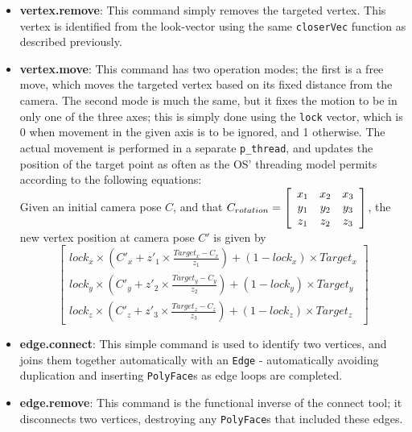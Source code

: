 \documentclass[a4paper,10pt]{article}
\begin{document}
\begin{itemize}
{Therefore, with arbitrary vectors $A$ and $B$, $A ~<~ B~$ iff \\$~(A - O ~\times~ A - V) ~~<~~ (B - O ~\times~ B - V)$. \\
}
\item{\textbf{vertex.remove}: This command simply removes the targeted vertex. This vertex is identified from the look-vector using the same \texttt{closerVec} function as described previously.}
\item{\textbf{vertex.move}: This command has two operation modes; the first is a free move, which moves the targeted vertex based on its fixed distance from the camera. The second mode is much the same, but it fixes the motion to be in only one of the three axes; this is simply done using the \texttt{lock} vector, which is 0 when movement in the given axis is to be ignored, and 1 otherwise. The actual movement is performed in a separate \texttt{p\_thread}, and updates the position of the target point as often as the OS' threading model permits according to the following equations:
\\

Given an initial camera pose $C$, and that $C_{rotation} = \left[
  \begin{array}{c c c}
    x_1 & x_2 & x_3 \\
    y_1 & y_2 & y_3 \\
    z_1 & z_2 & z_3
  \end{array}\right]$, the new vertex position at camera pose $C'$ is given by 
\\

$$\displaystyle \left[ 
  \begin{array}{c}
    lock_x \times (C'_x + z'_1 \times \frac{Target_x - C_x}{z_1}) + (1 - lock_x) \times Target_x \\ 
    lock_y \times (C'_y + z'_2 \times \frac{Target_y - C_y}{z_2}) + (1 - lock_y) \times Target_y \\ 
    lock_z \times (C'_z + z'_3 \times \frac{Target_z - C_z}{z_3}) + (1 - lock_z) \times Target_z
  \end{array}\right]$$
}
\item{\textbf{edge.connect}: This simple command is used to identify two vertices, and joins them together automatically with an \texttt{Edge} - automatically avoiding duplication and inserting \texttt{PolyFace}s as edge loops are completed.}
\item{\textbf{edge.remove}: This command is the functional inverse of the connect tool; it disconnects two vertices, destroying any \texttt{PolyFace}s that included these edges.}


\end{itemize}
\end{document}
